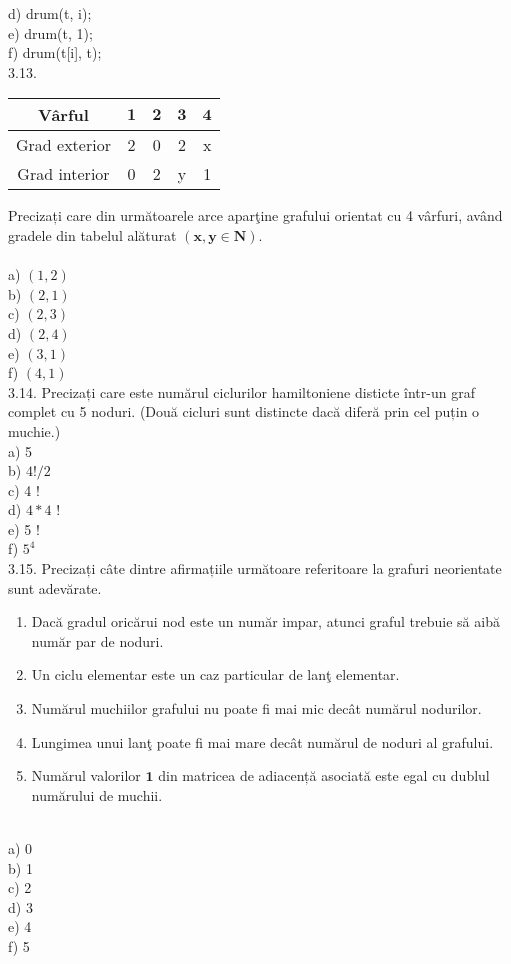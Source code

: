 d) drum(t, i);
\\
e) drum(t, 1);
\\
f) drum(t[i], t);
\\
3.13. \begin{center}
\begin{tabular}{|c|c|c|c|c|}
\hline
Vârful & $\mathbf{1}$ & $\mathbf{2}$ & $\mathbf{3}$ & $\mathbf{4}$ \\
\hline
Grad exterior & 2 & 0 & 2 & x \\
\hline
Grad interior & 0 & 2 & y & 1 \\
\hline
\end{tabular}
\end{center}
Precizați care din următoarele arce aparţine grafului orientat cu 4 vârfuri, având gradele din tabelul alăturat $(\mathbf{x}, \mathbf{y} \in \mathbf{N})$.\\
\\
a) $(1,2)$
\\
b) $(2,1)$
\\
c) $(2,3)$
\\
d) $(2,4)$
\\
e) $(3,1)$
\\
f) $(4,1)$
\\
3.14. Precizați care este numărul ciclurilor hamiltoniene disticte într-un graf complet cu 5 noduri. (Două cicluri sunt distincte dacă diferă prin cel puțin o muchie.)
\\
a) 5
\\
b) $4!/ 2$
\\
c) 4 !
\\
d) $4 * 4$ !
\\
e) 5 !
\\
f) $5^{4}$
\\
3.15. Precizați câte dintre afirmațiile următoare referitoare la grafuri neorientate sunt adevărate.
\begin{enumerate}
  \item Dacă gradul oricărui nod este un număr impar, atunci graful trebuie să aibă număr par de noduri.
  \item Un ciclu elementar este un caz particular de lanţ elementar.
  \item Numărul muchiilor grafului nu poate fi mai mic decât numărul nodurilor.
  \item Lungimea unui lanţ poate fi mai mare decât numărul de noduri al grafului.
  \item Numărul valorilor $\mathbf{1}$ din matricea de adiacență asociată este egal cu dublul numărului de muchii.
\end{enumerate}
\\
a) 0
\\
b) 1
\\
c) 2
\\
d) 3
\\
e) 4
\\
f) 5
\\

